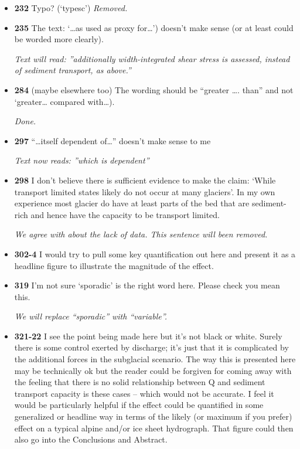 \documentclass[11pt]{article}
\begin{document}
\begin{itemize}
\item \textbf{232} Typo? (‘typesc’)
  \textit{Removed.}
  
\item \textbf{235} The text: ‘…as used as proxy for…’) doesn’t make sense (or at least could be
  worded more clearly).

\textit{Text will read: ''additionally width-integrated shear stress is assessed, instead of sediment transport, as above.''}
  
\item \textbf{284} (maybe
  elsewhere too)
  The wording should be “greater …. than” and not ‘greater… compared
  with…).

  \textit{Done.}

\item \textbf{297} “…itself dependent of…” doesn’t make sense to me

  \textit{Text now reads: ''which is dependent''}

\item \textbf{298} I don’t believe there is sufficient evidence to make the claim: ‘While
  transport limited states likely do not occur at many glaciers’. In my own
  experience most glacier do have at least parts of the bed that are sediment-
  rich and hence have the capacity to be transport limited.

  \textit{We agree with  about the lack of data. This sentence will been removed. }


  
\item \textbf{302-4} I would try to pull some key quantification out here and present it as a
  headline figure to illustrate the magnitude of the effect.

\item \textbf{319} I’m not sure ‘sporadic’ is the right word here. Please check you mean this.

  \textit{We will replace ``sporadic'' with ``variable''.}
  

  
\item \textbf{321-22} I see the point being made here but it’s not black or white. Surely there is
  some control exerted by discharge; it’s just that it is complicated by the
  additional forces in the subglacial scenario. The way this is presented here
  may be technically ok but the reader could be forgiven for coming away
  with the feeling that there is no solid relationship between Q and sediment
  transport capacity is these cases – which would not be accurate. I feel it
  would be particularly helpful if the effect could be quantified in some
  generalized or headline way in terms of the likely (or maximum if you
  prefer) effect on a typical alpine and/or ice sheet hydrograph. That figure
  could then also go into the Conclusions and Abstract.


\end{itemize}
\end{document}
